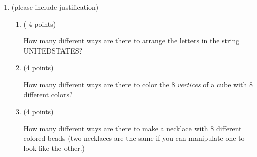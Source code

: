 \documentclass[10pt,letterpaper,unboxed,cm]{article}
\begin{document}
\begin{enumerate}
For Example: Given the expression: $8*9^7$, here are a few sets that it could possibly count:

\begin{itemize}
\item
The number of strings of digits of length 8 with exactly one occurrence of 0.
\begin{quote}
(Reasoning:) The factor $8$ tells us which position the 0 is in and the factor $9^7$ tells us the rest of the 7 positions using the remaining 9 digits.
\end{quote}
\item
The number of strings of length 8 that start with a letter $\{A,B,C,D,E,F,G,H\}$ and end with 7 digits from 1 to 9.
\begin{quote}
(Reasoning:) The factor $8$ tells us which letter is in the first position and the factor $9^7$ tells us the rest of the 7 positions using the digits 1 to 9.
\end{quote}
\item
The number of strings of digits of length 8 that start with a digit $\{0,1,2,3,4,5,6,7\}$ does not repeat the same digit in two consecutive positions
\begin{quote}
(Reasoning:) The factor $8$ tells us which digit is in the first position and the factor $9^7$ tells us each of the next 7 positions using the remaining 9 digits that are different than the digit before.
\end{quote}
\end{itemize}

\begin{enumerate}
\item

$$26*8*10^7$$

\item

$$10^3(26 + 10)^{5}{8\choose 3}$$

\item

$$(26 + 10)^{8} - 26^8$$

\item
$$26^8 + 10^8 + 10^4*26^4$$
\end{enumerate}

\item
(please include justification)
\begin{enumerate}
\item
( 4 points)

How many different ways are there to arrange the letters in the string UNITEDSTATES?
\item
(4 points)


How many different ways are there to color the 8 \emph{vertices} of a cube with 8 different colors?

\item
(4 points)

How many different ways are there to make a necklace with 8 different colored beads (two necklaces are the same if you can manipulate one to look like the other.)

\end{enumerate}
\end{enumerate}
\end{document}
